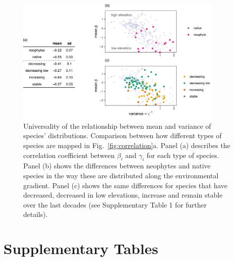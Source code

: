 \documentclass[11pt, a4paper]{article}
\begin{document}
\begin{figure}[ht]
  \centering
    \includegraphics[width=0.9\textwidth]{figures/means-Rapopor}
    	  \vspace{0.1cm}
	   \caption{Universality of the relationship between mean and variance of species' distributions. Comparison between how different types of species are mapped in Fig.~\ref{fig:correlation}a. Panel (a) describes the correlation coefficient between $\beta_i$ and $\gamma_i$ for each type of species. Panel (b) shows the differences between neophytes and native species in the way these are distributed along the environmental gradient. Panel (c) shows the same differences for species that have decreased, decreased in low elevations, increase and remain stable over the last decades (see Supplementary Table 1 for further details).}
      \label{sfig:universality}
\end{figure}

\clearpage

\section*{Supplementary Tables}
\end{document}
